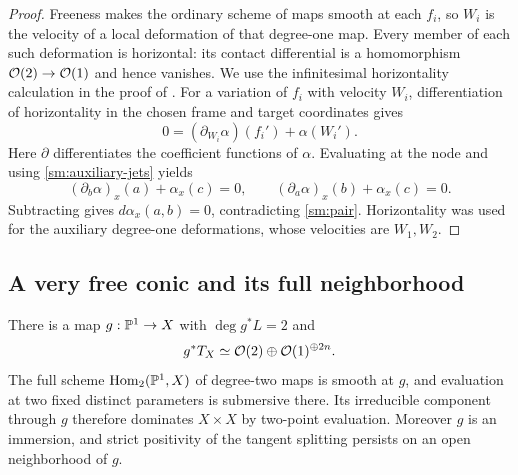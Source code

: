 \begin{proof}
Freeness makes the ordinary scheme of maps smooth at each
$f_i$, so $W_i$ is the velocity of a local deformation of
that degree-one map. Every member of each such deformation
is horizontal: its contact differential is a homomorphism
$\mathcal O(2)\to\mathcal O(1)$ and hence vanishes.
We use the infinitesimal horizontality calculation in the proof of
\cite[Proposition~3.1]{Kebekus2001}. For a variation of $f_i$ with
velocity $W_i$, differentiation of horizontality in the chosen frame
and target coordinates gives
\[
0=(\partial_{W_i}\alpha)(f_i')+\alpha(W_i').
\]
Here $\partial$ differentiates the coefficient functions of
$\alpha$. Evaluating at the node and using
\eqref{sm:auxiliary-jets} yields
\[
(\partial_b\alpha)_x(a)+\alpha_x(c)=0,
\qquad
(\partial_a\alpha)_x(b)+\alpha_x(c)=0.
\]
Subtracting gives $d\alpha_x(a,b)=0$, contradicting
\eqref{sm:pair}. Horizontality was used for the auxiliary
degree-one deformations, whose velocities are $W_1,W_2$.
\end{proof}

\subsection{A very free conic and its full neighborhood}

\begin{proposition}\label{sm:very-free}
There is a map $g:\mathbb P^1\to X$ with $\deg g^*L=2$ and
\begin{equation}\label{sm:positive-splitting}
g^*T_X\simeq\mathcal O(2)\oplus\mathcal O(1)^{\oplus2n}.
\end{equation}
The full scheme $\operatorname{Hom}_2(\mathbb P^1,X)$ of degree-two maps is smooth
at $g$, and evaluation at two fixed distinct parameters is
submersive there. Its irreducible component through $g$
therefore dominates $X\times X$ by two-point evaluation.
Moreover $g$ is an immersion, and strict positivity of the
tangent splitting persists on an open neighborhood of $g$.
\end{proposition}

